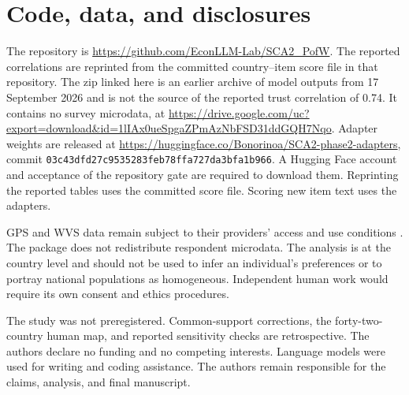 \section*{Code, data, and disclosures}
The repository is \url{https://github.com/EconLLM-Lab/SCA2_PofW}. The reported correlations are reprinted from the committed country--item score file in that repository. The zip linked here is an earlier archive of model outputs from 17 September 2026 and is not the source of the reported trust correlation of 0.74. It contains no survey microdata, at \url{https://drive.google.com/uc?export=download&id=1lIAx0ueSpgaZPmAzNbFSD31ddGQH7Nqo}. Adapter weights are released at \url{https://huggingface.co/Bonorinoa/SCA2-phase2-adapters}, commit \texttt{03c43dfd27c9535283feb78ffa727da3bfa1b966}. A Hugging Face account and acceptance of the repository gate are required to download them. Reprinting the reported tables uses the committed score file. Scoring new item text uses the adapters.

GPS and WVS data remain subject to their providers' access and use conditions \cite{falk2018,wvs2022}. The package does not redistribute respondent microdata. The analysis is at the country level and should not be used to infer an individual's preferences or to portray national populations as homogeneous. Independent human work would require its own consent and ethics procedures.

The study was not preregistered. Common-support corrections, the forty-two-country human map, and reported sensitivity checks are retrospective. The authors declare no funding and no competing interests. Language models were used for writing and coding assistance. The authors remain responsible for the claims, analysis, and final manuscript.

